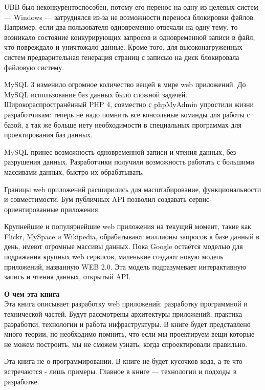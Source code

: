 UBB был неконкурентоспособен, потому его перенос на одну из целевых систем --- Windows --- затруднялся из-за не возможности переноса блокировки файлов. Например, если два пользователя одновременно отвечали на одну тему, то возникало состояние конкурирующих запросов и одновременной записи в файл, что повреждало и уничтожало данные. Кроме того, для высоконагруженных систем предварительная генерация страниц  с записью на диск блокировала файловую систему.


MySQL 3 изменило огромное количество вещей в мире web приложений. До MySQL использование баз данных было сложной задачей. Широкораспространённый PHP 4, совместно с phpMyAdmin упростили жизни разработчикам: теперь не надо помнить все консольные команды для работы с базой, а так же больше нету необходимости в специальных программах для проектирования баз данных.

MySQL принес возможность одновременной записи и чтения данных, без разрушения данных. Разработчики получили возможность работать с большими массивами данных, быстро их обрабатывать.

Границы web приложений расширились для масштабирование, функциональности и совместимости. Бум публичных API позволил создавать сервис-ориентированные приложения.

Крупнейшие и популярнейшие web приложения на текущий момент, такие как  Flickr, MySpace и Wikipedia, обрабатывают миллионы запросов к базе данный в день, имеют огромные массивы данных. Пока Google остаётся моделью для подражания крупных web сервисов, маленькие создают новую модель приложений, названную WEB 2.0. Эта модель подразумевает интерактивную запись и чтения данных, открытый API.


\textbf{О чем эта книга} \\

Эта книга описывает разработку web приложений: разработку программной и технической частей. Будут рассмотрены архитектуры приложений, практика разработки, технологии и работа инфраструктуры. В книге будет представлено много теории, но необходимо помнить, что если мы проектируем вещи которые не можем построить, мы не сможем узнать, когда спроектировали правильно.


Эта книга не о программировании. В книге не будет кусочков кода, а те что встречаются - лишь примеры. Главное в книге --- технологии и подходы в разработке.

